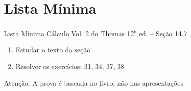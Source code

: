 \documentclass[fleqn,utf8,aspectratio=169,12pt,ignorenonframetext]{beamer}
\begin{document}



\section{Lista Mínima}

\begin{frame}{Lista Mínima}
  Cálculo Vol. 2 do Thomas 12\textsuperscript{a} ed. -- Seção 14.7
  \begin{enumerate}
    \item Estudar o texto da seção
    \item Resolver os exercícios: 31, 34, 37, 38
  \end{enumerate}

  \vfill
  Atenção: A prova é baseada no livro, não nas apresentações
\end{frame}

\end{document}
